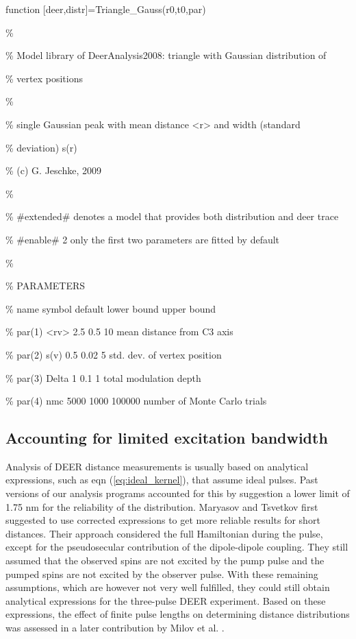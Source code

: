 \documentclass{article}
\begin{document}
{\ttfamily \small
function [deer,distr]=Triangle\_Gauss(r0,t0,par)

\%

\% Model library of DeerAnalysis2008: triangle with Gaussian distribution of

\% vertex positions

\%

\% single Gaussian peak with mean distance <r> and width (standard

\% deviation) s(r)

\% (c) G. Jeschke, 2009

\%

\% \#extended\# denotes a model that provides both distribution and deer trace

\% \#enable\# 2 only the first two parameters are fitted by default

\% 

\% PARAMETERS

\% name    symbol default lower bound upper bound

\% par(1)  <rv>   2.5     0.5         10         mean distance from C3 axis

\% par(2)  s(v)   0.5     0.02        5          std. dev. of vertex position

\% par(3)  Delta    1     0.1         1          total modulation depth

\% par(4)  nmc    5000    1000        100000     number of Monte Carlo trials 

}

\subsection{Accounting for limited excitation bandwidth}
\label{bandwidth}
Analysis of DEER distance measurements is usually based on analytical expressions, such as eqn (\ref{eq:ideal_kernel}), that assume ideal pulses. Past versions of our analysis programs accounted for this by suggestion a lower limit of 1.75 nm for the reliability of the distribution. Maryasov and Tsvetkov \cite{maryasov2000} first suggested to use corrected expressions to get more reliable results for short distances. Their approach considered the full Hamiltonian during the pulse, except for the pseudosecular contribution of the dipole-dipole coupling. They still assumed that the observed spins are not excited by the pump pulse and the pumped spins are not excited by the observer pulse. With these remaining assumptions, which are however not very well fulfilled, they could still obtain analytical expressions for the three-pulse DEER experiment. Based on these expressions, the effect of finite pulse lengths on determining distance distributions was assessed in a later contribution by Milov et al. \cite{milov2004}.
\end{document}
